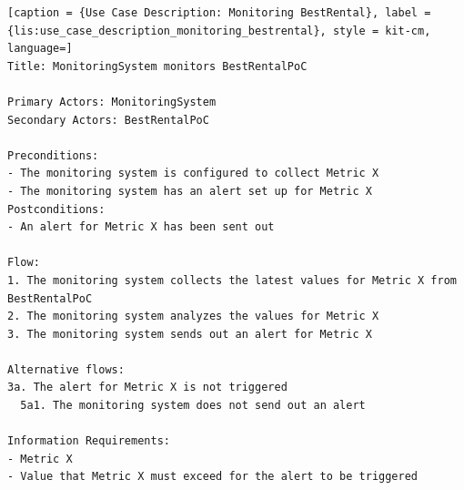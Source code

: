\vspace{0.5cm}
\begin{lstlisting}[caption = {Use Case Description: Monitoring BestRental}, label = {lis:use_case_description_monitoring_bestrental}, style = kit-cm, language=] 
Title: MonitoringSystem monitors BestRentalPoC

Primary Actors: MonitoringSystem
Secondary Actors: BestRentalPoC

Preconditions:  
- The monitoring system is configured to collect Metric X
- The monitoring system has an alert set up for Metric X
Postconditions:  
- An alert for Metric X has been sent out

Flow:
1. The monitoring system collects the latest values for Metric X from BestRentalPoC
2. The monitoring system analyzes the values for Metric X
3. The monitoring system sends out an alert for Metric X

Alternative flows:
3a. The alert for Metric X is not triggered
  5a1. The monitoring system does not send out an alert
	
Information Requirements: 
- Metric X
- Value that Metric X must exceed for the alert to be triggered
\end{lstlisting}